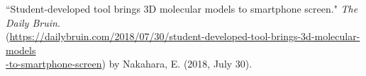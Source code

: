 \newpage

``Student-developed tool brings 3D molecular models to smartphone screen." \textit{The Daily Bruin}. \\ (\textcolor{RoyalBlue}{\href{https://dailybruin.com/2018/07/30/student-developed-tool-brings-3d-molecular-models-to-smartphone-screen}{https://dailybruin.com/2018/07/30/student-developed-tool-brings-3d-molecular-models \\ -to-smartphone-screen}}) by Nakahara, E. (2018, July 30).